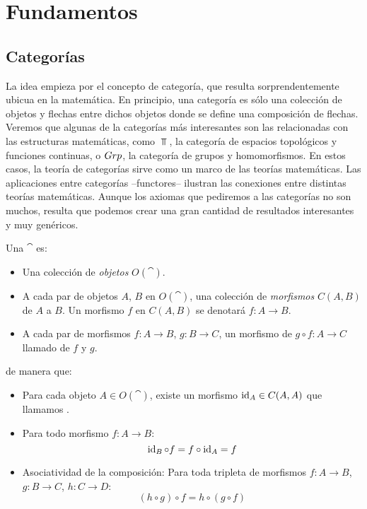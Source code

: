 \chapter{Fundamentos}
\section{Categorías}

La idea empieza por el concepto de categoría, que resulta sorprendentemente ubicua en la matemática.
En principio, una categoría es sólo una colección de objetos y flechas entre dichos objetos donde se define una composición de flechas.
Veremos que algunas de la categorías más interesantes son las relacionadas con las estructuras matemáticas, como $\Top$, la categoría de espacios topológicos y funciones continuas, o ${Grp}$, la categoría de grupos y homomorfismos.
En estos casos, la teoría de categorías sirve como un marco de las teorías matemáticas.
Las aplicaciones entre categorías --functores-- ilustran las conexiones entre distintas teorías matemáticas.
Aunque los axiomas que pediremos a las categorías no son muchos, resulta que podemos crear una gran cantidad de resultados interesantes y muy genéricos.

\begin{definition}
Una  $\cat$ es:
\begin{itemize}
\item Una colección de \emph{objetos} $O(\cat)$.
\item A cada par de objetos $A$, $B$ en $O(\cat)$, una colección de \emph{morfismos} $C(A,B)$ de $A$ a $B$.
Un morfismo $f$ en $C(A,B)$ se denotará $f \colon A \to B$.
\item A cada par de morfismos $f \colon A \to B$, $g \colon B \to C$, un morfismo de $g \circ f \colon A \to C$ llamado  de $f$ y $g$.
\end{itemize}
de manera que:
\begin{itemize}
\item Para cada objeto $A \in O(\cat)$, existe un morfismo $\operatorname{id}_A \in C(A,A)$ que llamamos .
\item Para todo morfismo $f \colon A \to B$:
\[ \operatorname{id}_B \circ f = f \circ \operatorname{id}_A = f \]
\item Asociatividad de la composición: Para toda tripleta de morfismos $f \colon A \to B$, $g \colon B \to C$, $h \colon C \to D$:
\begin{equation}\label{cat:3} (h \circ g) \circ f = h \circ (g \circ f) \end{equation}
\end{itemize}
\end{definition}

